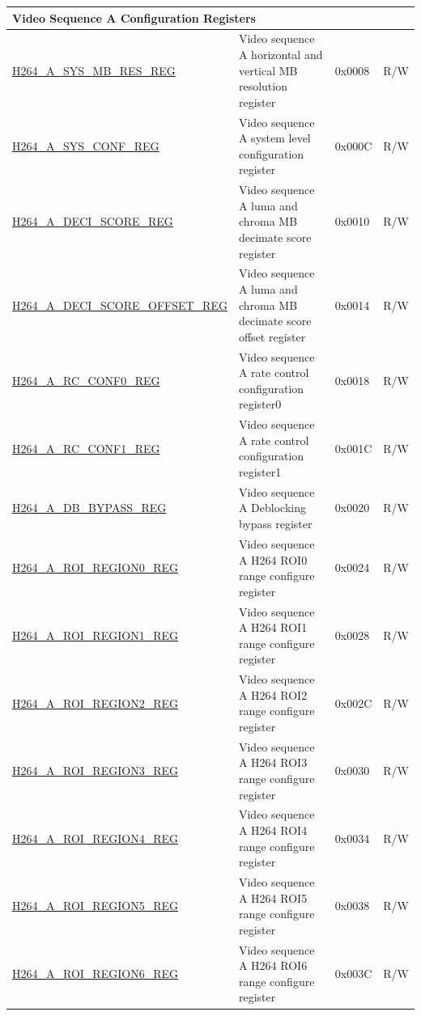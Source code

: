 \begin{longtable}{ | p{7cm} | p{6.2cm} | p{1.2cm} | p{1cm} | }
\multicolumn{4}{|l|}{\textbf{Video Sequence A Configuration Registers}} \\ \hline
\hyperref[regdesc:H264ASYSMBRESREG]{H264\_A\_SYS\_MB\_RES\_REG} & Video sequence A horizontal and vertical MB resolution register  & 0x0008 & R/W \\ \hline
\hyperref[regdesc:H264ASYSCONFREG]{H264\_A\_SYS\_CONF\_REG} & Video sequence A system level configuration register & 0x000C & R/W \\ \hline
\hyperref[regdesc:H264ADECISCOREREG]{H264\_A\_DECI\_SCORE\_REG} & Video sequence A luma and chroma MB decimate score register & 0x0010 & R/W \\ \hline
\hyperref[regdesc:H264ADECISCOREOFFSETREG]{H264\_A\_DECI\_SCORE\_OFFSET\_REG} & Video sequence A luma and chroma MB decimate score offset register & 0x0014 & R/W \\ \hline
\hyperref[regdesc:H264ARCCONF0REG]{H264\_A\_RC\_CONF0\_REG} & Video sequence A rate control configuration register0 & 0x0018 & R/W \\ \hline
\hyperref[regdesc:H264ARCCONF1REG]{H264\_A\_RC\_CONF1\_REG} & Video sequence A rate control configuration register1 & 0x001C & R/W \\ \hline
\hyperref[regdesc:H264ADBBYPASSREG]{H264\_A\_DB\_BYPASS\_REG} & Video sequence A Deblocking bypass register & 0x0020 & R/W \\ \hline
\hyperref[regdesc:H264AROIREGION0REG]{H264\_A\_ROI\_REGION0\_REG} & Video sequence A H264 ROI0 range configure register  & 0x0024 & R/W \\ \hline
\hyperref[regdesc:H264AROIREGION1REG]{H264\_A\_ROI\_REGION1\_REG} & Video sequence A H264 ROI1 range configure register & 0x0028 & R/W \\ \hline
\hyperref[regdesc:H264AROIREGION2REG]{H264\_A\_ROI\_REGION2\_REG} & Video sequence A H264 ROI2 range configure register & 0x002C & R/W \\ \hline
\hyperref[regdesc:H264AROIREGION3REG]{H264\_A\_ROI\_REGION3\_REG} & Video sequence A H264 ROI3 range configure register & 0x0030 & R/W \\ \hline
\hyperref[regdesc:H264AROIREGION4REG]{H264\_A\_ROI\_REGION4\_REG} & Video sequence A H264 ROI4 range configure register & 0x0034 & R/W \\ \hline
\hyperref[regdesc:H264AROIREGION5REG]{H264\_A\_ROI\_REGION5\_REG} & Video sequence A H264 ROI5 range configure register & 0x0038 & R/W \\ \hline
\hyperref[regdesc:H264AROIREGION6REG]{H264\_A\_ROI\_REGION6\_REG} & Video sequence A H264 ROI6 range configure register & 0x003C & R/W \\ \hline

\end{longtable}
